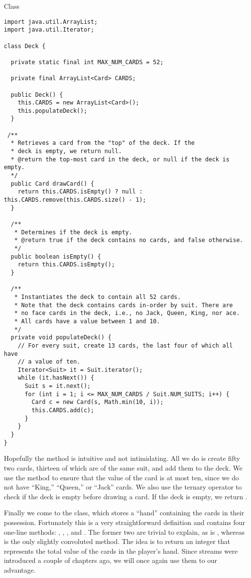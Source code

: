 \begin{cl}{ Class}
\begin{lstlisting}[language=MyJava]
import java.util.ArrayList;
import java.util.Iterator;

class Deck {

  private static final int MAX_NUM_CARDS = 52;

  private final ArrayList<Card> CARDS;

  public Deck() {
    this.CARDS = new ArrayList<Card>();
    this.populateDeck();
  }

 /**
  * Retrieves a card from the "top" of the deck. If the
  * deck is empty, we return null.
  * @return the top-most card in the deck, or null if the deck is empty.
  */
  public Card drawCard() {
    return this.CARDS.isEmpty() ? null : this.CARDS.remove(this.CARDS.size() - 1);
  }

  /**
   * Determines if the deck is empty.
   * @return true if the deck contains no cards, and false otherwise.
   */
  public boolean isEmpty() { 
    return this.CARDS.isEmpty(); 
  }

  /**
   * Instantiates the deck to contain all 52 cards.
   * Note that the deck contains cards in-order by suit. There are 
   * no face cards in the deck, i.e., no Jack, Queen, King, nor ace.
   * All cards have a value between 1 and 10.
   */
  private void populateDeck() {
    // For every suit, create 13 cards, the last four of which all have
    // a value of ten.
    Iterator<Suit> it = Suit.iterator();
    while (it.hasNext()) {
      Suit s = it.next();
      for (int i = 1; i <= MAX_NUM_CARDS / Suit.NUM_SUITS; i++) {
        Card c = new Card(s, Math.min(10, i));
        this.CARDS.add(c);
      }
    }
  }
}
\end{lstlisting}
\end{cl}

Hopefully the  method is intuitive and not intimidating. All we do is create fifty two cards, thirteen of which are of the same suit, and add them to the deck. We use the  method to ensure that the value of the card is at most ten, since we do not have ``King,'' ``Queen,'' or ``Jack'' cards. We also use the ternary operator to check if the deck is empty before drawing a card. If the deck is empty, we return .

Finally we come to the  class, which stores a ``hand'' containing the cards in their possession. Fortunately this is a very straightforward definition and contains four one-line methods: , , , and . The former two are trivial to explain, as is , whereas  is the only slightly convoluted method. The idea is to return an integer that represents the total value of the cards in the player's hand. Since streams were introduced a couple of chapters ago, we will once again use them to our advantage.

